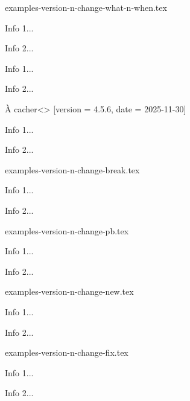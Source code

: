 \begin{filecontents*}[overwrite]{examples-version-n-change-what-n-when.tex}
\begin{tdoctech}[date = 2024-10-29,
                 col  = red]
    \item Info 1...
    \item Info 2...
\end{tdoctech}

\begin{tdocupdate}[version = 1.2.3,
                   col     = ForestGreen]
    \item Info 1...
    \item Info 2...
\end{tdocupdate}

\begin{tdoctopic}{À cacher}<\faEyeSlash>%
                 [version = 4.5.6, date = 2025-11-30]
    \item Info 1...
    \item Info 2...
\end{tdoctopic}
\end{filecontents*}


\begin{filecontents*}[overwrite]{examples-version-n-change-break.tex}
\begin{tdocbreak}
    \item Info 1...
    \item Info 2...
\end{tdocbreak}
\end{filecontents*}


\begin{filecontents*}[overwrite]{examples-version-n-change-pb.tex}
\begin{tdocprob}
    \item Info 1...
    \item Info 2...
\end{tdocprob}
\end{filecontents*}


\begin{filecontents*}[overwrite]{examples-version-n-change-new.tex}
\begin{tdocnew}
    \item Info 1...
    \item Info 2...
\end{tdocnew}
\end{filecontents*}


\begin{filecontents*}[overwrite]{examples-version-n-change-fix.tex}
\begin{tdocfix}
    \item Info 1...
    \item Info 2...
\end{tdocfix}
\end{filecontents*}


